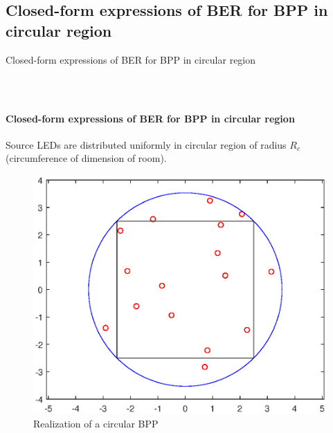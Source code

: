 \documentclass{beamer}
\theoremstyle{remark}
\begin{document}
\subsection{Closed-form expressions of BER for BPP in circular region}
\begin{frame}
\vfill
\centering
Closed-form expressions of BER for BPP in circular region
\vfill
\end{frame}
\begin{frame}
\frametitle{\,}
\framesubtitle{Closed-form expressions of BER for BPP in circular region}
\vfill
Source LEDs are distributed uniformly in circular region of radius $R_c$(circumference of dimension of room).
\begin{figure}
        \centering
        \includegraphics[width=.6\framewidth]{LEDArrangementCircumcircle}
        \caption{Realization of a circular BPP}
        \end{figure}
\end{frame}
\end{document}
